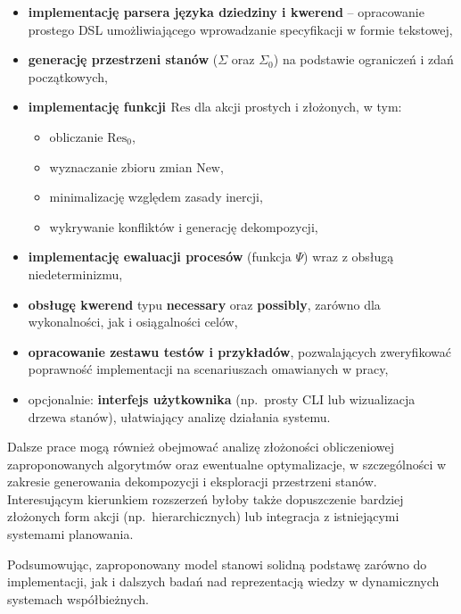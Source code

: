\documentclass[11pt,a4paper]{article}
\newif\ifshowbib
\theoremstyle{definition}
\begin{document}
\begin{itemize}
    \item \textbf{implementację parsera języka dziedziny i kwerend} -- opracowanie prostego DSL umożliwiającego wprowadzanie specyfikacji w formie tekstowej,
    \item \textbf{generację przestrzeni stanów} ($\Sigma$ oraz $\Sigma_0$) na podstawie ograniczeń i zdań początkowych,
    \item \textbf{implementację funkcji $\mathrm{Res}$} dla akcji prostych i złożonych, w tym:
    \begin{itemize}
        \item obliczanie $\mathrm{Res}_0$,
        \item wyznaczanie zbioru zmian $\mathrm{New}$,
        \item minimalizację względem zasady inercji,
        \item wykrywanie konfliktów i generację dekompozycji,
    \end{itemize}
    \item \textbf{implementację ewaluacji procesów} (funkcja $\Psi$) wraz z obsługą niedeterminizmu,
    \item \textbf{obsługę kwerend} typu \textbf{necessary} oraz \textbf{possibly}, zarówno dla wykonalności, jak i osiągalności celów,
    \item \textbf{opracowanie zestawu testów i przykładów}, pozwalających zweryfikować poprawność implementacji na scenariuszach omawianych w pracy,
    \item opcjonalnie: \textbf{interfejs użytkownika} (np.\ prosty CLI lub wizualizacja drzewa stanów), ułatwiający analizę działania systemu.
\end{itemize}

Dalsze prace mogą również obejmować analizę złożoności obliczeniowej zaproponowanych algorytmów oraz ewentualne optymalizacje, w szczególności w zakresie generowania dekompozycji i eksploracji przestrzeni stanów. Interesującym kierunkiem rozszerzeń byłoby także dopuszczenie bardziej złożonych form akcji (np.\ hierarchicznych) lub integracja z istniejącymi systemami planowania.

Podsumowując, zaproponowany model stanowi solidną podstawę zarówno do implementacji, jak i dalszych badań nad reprezentacją wiedzy w dynamicznych systemach współbieżnych.

\ifshowbib
\section{Literatura}

\fi
\end{document}
